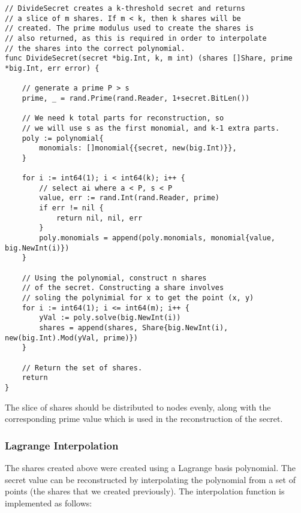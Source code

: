 \documentclass[a4paper,12pt]{article}
\begin{document}
\begin{Verbatim}[obeytabs,tabsize=4]
// DivideSecret creates a k-threshold secret and returns
// a slice of m shares. If m < k, then k shares will be
// created. The prime modulus used to create the shares is
// also returned, as this is required in order to interpolate
// the shares into the correct polynomial.
func DivideSecret(secret *big.Int, k, m int) (shares []Share, prime *big.Int, err error) {

	// generate a prime P > s
	prime, _ = rand.Prime(rand.Reader, 1+secret.BitLen())

	// We need k total parts for reconstruction, so
	// we will use s as the first monomial, and k-1 extra parts.
	poly := polynomial{
		monomials: []monomial{{secret, new(big.Int)}},
	}

	for i := int64(1); i < int64(k); i++ {
		// select ai where a < P, s < P
		value, err := rand.Int(rand.Reader, prime)
		if err != nil {
			return nil, nil, err
		}
		poly.monomials = append(poly.monomials, monomial{value, big.NewInt(i)})
	}

	// Using the polynomial, construct n shares
	// of the secret. Constructing a share involves
	// soling the polynimial for x to get the point (x, y)
	for i := int64(1); i <= int64(m); i++ {
		yVal := poly.solve(big.NewInt(i))
		shares = append(shares, Share{big.NewInt(i), new(big.Int).Mod(yVal, prime)})
	}

	// Return the set of shares.
	return
}
\end{Verbatim}

The slice of shares should be distributed to nodes evenly, along with the corresponding prime value which is used in the reconstruction of the secret.

\subsubsection{Lagrange Interpolation}
The shares created above were created using a Lagrange basis polynomial. The secret value can be reconstructed by interpolating the polynomial from a set of points (the shares that we created previously). The interpolation function is implemented as follows:
\end{document}
